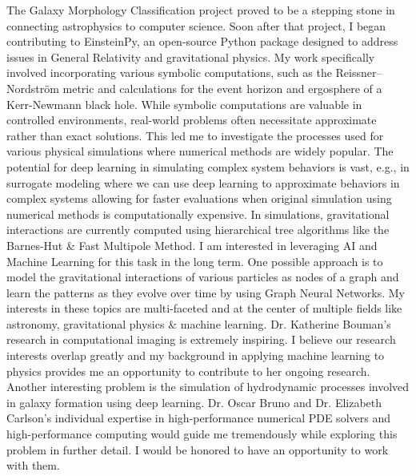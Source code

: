 \documentclass{article}
\begin{document}
\hspace{0.25in}The Galaxy Morphology Classification project proved to be a
stepping stone in connecting astrophysics to computer science. Soon after that
project, I began contributing to EinsteinPy, an open-source Python package
designed to address issues in General Relativity and gravitational physics. My
work specifically involved incorporating various symbolic computations, such as
the Reissner–Nordström metric and calculations for the event horizon and
ergosphere of a Kerr-Newmann black hole. While symbolic computations are
valuable in controlled environments, real-world problems often necessitate
approximate rather than exact solutions. This led me to investigate the
processes used for various physical simulations where numerical methods are
widely popular. The potential for deep learning in simulating complex system
behaviors is vast, e.g., in surrogate modeling where we can use deep learning to
approximate behaviors in complex systems allowing for faster evaluations when
original simulation using numerical methods is computationally expensive. In
simulations, gravitational interactions are currently computed using
hierarchical tree algorithms like the Barnes-Hut \& Fast Multipole Method. I am
interested in leveraging AI and Machine Learning for this task in the long term.
One possible approach is to model the gravitational interactions of various
particles as nodes of a graph and learn the patterns as they evolve over time by
using Graph Neural Networks. My interests in these topics are multi-faceted and
at the center of multiple fields like astronomy, gravitational physics \& machine
learning. Dr. Katherine Bouman's research in computational imaging is extremely
inspiring. I believe our research interests overlap greatly and my background in
applying machine learning to physics provides me an opportunity to contribute to
her ongoing research. Another interesting problem is the simulation of
hydrodynamic processes involved in galaxy formation using deep learning. Dr.
Oscar Bruno and Dr. Elizabeth Carlson's individual expertise in high-performance
numerical PDE solvers and high-performance computing would guide me tremendously
while exploring this problem in further detail. I would be honored to have an
opportunity to work with them.\vspace{5pt}
\end{document}
